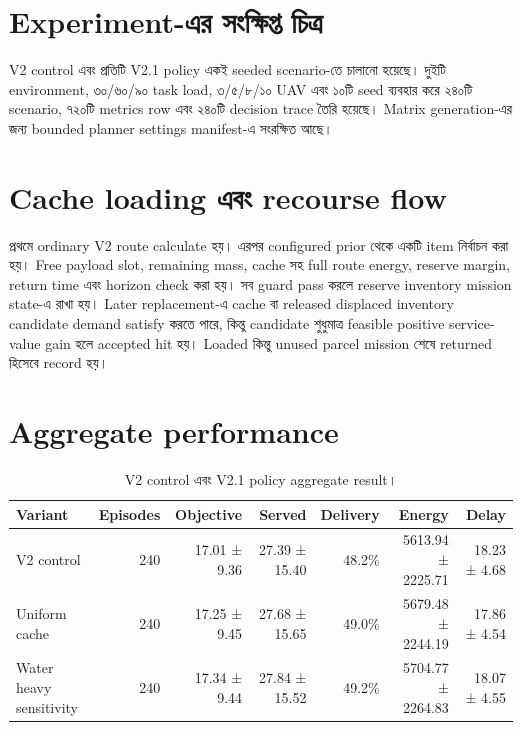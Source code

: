 \documentclass[10pt,a4paper]{article}
\begin{document}
\section{Experiment-এর সংক্ষিপ্ত চিত্র}
V2 control এবং প্রতিটি V2.1 policy একই seeded scenario-তে চালানো হয়েছে। দুইটি environment, ৩০/৬০/৯০ task load, ৩/৫/৮/১০ UAV এবং ১০টি seed ব্যবহার করে ২৪০টি scenario, ৭২০টি metrics row এবং ২৪০টি decision trace তৈরি হয়েছে। Matrix generation-এর জন্য bounded planner settings manifest-এ সংরক্ষিত আছে।
\section{Cache loading এবং recourse flow}
প্রথমে ordinary V2 route calculate হয়। এরপর configured prior থেকে একটি item নির্বাচন করা হয়। Free payload slot, remaining mass, cache সহ full route energy, reserve margin, return time এবং horizon check করা হয়। সব guard pass করলে reserve inventory mission state-এ রাখা হয়। Later replacement-এ cache বা released displaced inventory candidate demand satisfy করতে পারে, কিন্তু candidate শুধুমাত্র feasible positive service-value gain হলে accepted hit হয়। Loaded কিন্তু unused parcel mission শেষে returned হিসেবে record হয়।
\section{Aggregate performance}
\begin{table}[htbp]\centering\scriptsize
\caption{V2 control এবং V2.1 policy aggregate result।}
\begin{tabular}{@{}lrrrrrr@{}}\toprule
Variant & Episodes & Objective & Served & Delivery & Energy & Delay\\\midrule
V2 control & 240 & 17.01 ± 9.36 & 27.39 ± 15.40 & 48.2\% & 5613.94 ± 2225.71 & 18.23 ± 4.68 \\
Uniform cache & 240 & 17.25 ± 9.45 & 27.68 ± 15.65 & 49.0\% & 5679.48 ± 2244.19 & 17.86 ± 4.54 \\
Water heavy sensitivity & 240 & 17.34 ± 9.44 & 27.84 ± 15.52 & 49.2\% & 5704.77 ± 2264.83 & 18.07 ± 4.55 \\
\bottomrule\end{tabular}\end{table}
\end{document}
